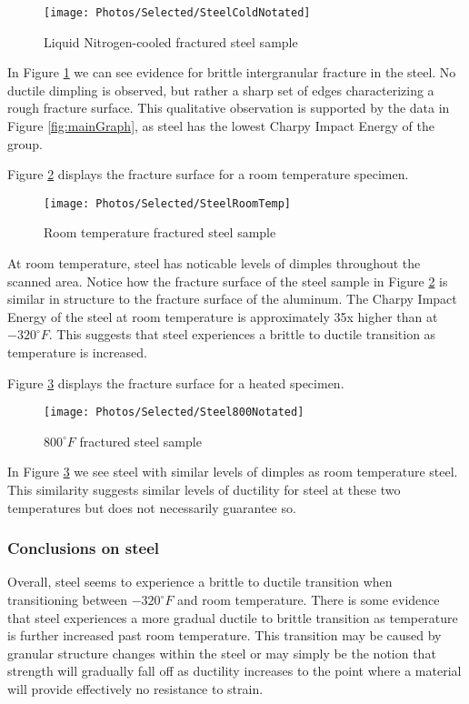\documentclass{article}
\begin{document}
\begin{figure}[H]
\centering
\texttt{[image: Photos/Selected/SteelColdNotated]}
\caption{Liquid Nitrogen-cooled fractured steel sample}
\label{fig:SteelCold}
\end{figure}

In Figure \ref{fig:SteelCold} we can see evidence for brittle intergranular fracture in the steel. No ductile dimpling is observed, but rather a sharp set of edges characterizing a rough fracture surface. This qualitative observation is supported by the data in Figure \ref{fig:mainGraph}, as steel has the lowest Charpy Impact Energy of the group.

Figure \ref{fig:SteelRoomTemp} displays the fracture surface for a room temperature specimen.

\begin{figure}[H]
\centering
\texttt{[image: Photos/Selected/SteelRoomTemp]}
\caption{Room temperature fractured steel sample}
\label{fig:SteelRoomTemp}
\end{figure}

At room temperature, steel has noticable levels of dimples throughout the scanned area. Notice how the fracture surface of the steel sample in Figure \ref{fig:SteelRoomTemp} is similar in structure to the fracture surface of the aluminum. The Charpy Impact Energy of the steel at room temperature is approximately 35x higher than at $-320^\circ F$. This suggests that steel experiences a brittle to ductile transition as temperature is increased.

Figure \ref{fig:Steel800} displays the fracture surface for a heated specimen.

\begin{figure}[H]
\centering
\texttt{[image: Photos/Selected/Steel800Notated]}
\caption{$800^\circ F$ fractured steel sample}
\label{fig:Steel800}
\end{figure}

In Figure \ref{fig:Steel800} we see steel with similar levels of dimples as room temperature steel. This similarity suggests similar levels of ductility for steel at these two temperatures but does not necessarily guarantee so.

\subsubsection*{Conclusions on steel}

Overall, steel seems to experience a brittle to ductile transition when transitioning between $-320^\circ F$ and room temperature. There is some evidence that steel experiences a more gradual ductile to brittle transition as temperature is further increased past room temperature. This transition may be caused by granular structure changes within the steel or may simply be the notion that strength will gradually fall off as ductility increases to the point where a material will provide effectively no resistance to strain.
\end{document}
